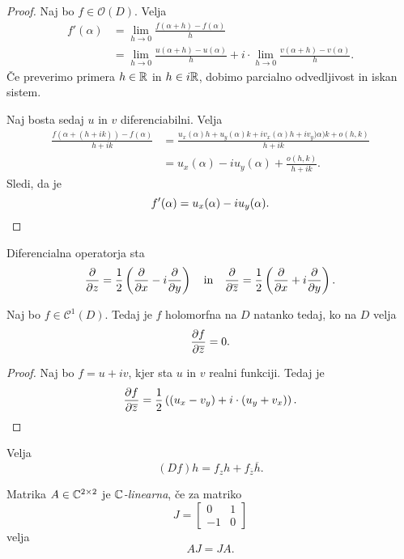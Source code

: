 \begin{proof}
Naj bo $f \in \mathcal{O}(D)$. Velja
\begin{align*}
f'(\alpha) &= \lim_{h \to 0} \frac{f(\alpha + h) - f(\alpha)}{h}
\\
&=
\lim_{h \to 0} \frac{u(\alpha + h) - u(\alpha)}{h} +
i \cdot \lim_{h \to 0} \frac{v(\alpha + h) - v(\alpha)}{h}.
\end{align*}
Če preverimo primera $h \in \mathbb{R}$ in $h \in i\mathbb{R}$, dobimo parcialno
odvedljivost in iskan sistem.

Naj bosta sedaj $u$ in $v$ diferenciabilni. Velja
\begin{align*}
\frac{f(\alpha + (h + ik)) - f(\alpha)}{h + ik} &=
\frac{u_x(\alpha)h + u_y(\alpha)k + iv_x(\alpha)h + iv_y)\alpha)k +
o(h,k)}{h + ik}
\\
&=
u_x(\alpha) - iu_y(\alpha) + \frac{o(h,k)}{h + ik}.
\end{align*}
Sledi, da je
\[
f'(\alpha) = u_x(\alpha) - iu_y(\alpha). \qedhere
\]
\end{proof}

\begin{definicija}
Diferencialna operatorja sta
\[
\frac{\partial }{\partial z} =
\frac{1}{2} \left(\frac{\partial }{\partial x} - i \frac{\partial }{\partial y}\right)
\quad \text{in} \quad
\frac{\partial }{\partial \overline{z}} =
\frac{1}{2} \left(\frac{\partial }{\partial x} + i \frac{\partial }{\partial y}\right).
\]
\end{definicija}

\begin{trditev}
Naj bo $f \in \mathcal{C}^1(D)$. Tedaj je $f$ holomorfna na $D$
natanko tedaj, ko na $D$ velja
\[
\frac{\partial f}{\partial \overline{z}} = 0.
\]
\end{trditev}

\begin{proof}
Naj bo $f = u + iv$, kjer sta $u$ in $v$ realni funkciji. Tedaj je
\[
\frac{\partial f}{\partial \overline{z}} =
\frac{1}{2} \left((u_x - v_y) + i \cdot (u_y + v_x)\right).
\qedhere
\]
\end{proof}

\begin{trditev}
Velja
\[
(Df)h = f_z h + f_{\overline{z}} \overline{h}.
\]
\end{trditev}

\obvs

\begin{definicija}
Matrika $A \in \mathbb{C}^{2 \times 2}$ je \emph{$\mathbb{C}$-linearna}, če za
matriko
\[
J =
\begin{bmatrix}
 0 & 1 \\
-1 & 0
\end{bmatrix}
\]
velja
\[
AJ = JA.
\]
\end{definicija}

